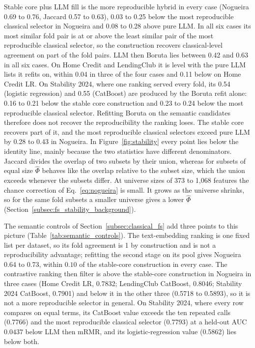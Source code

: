 \documentclass[final,5p,twocolumn]{elsarticle}
\begin{document}
Stable core plus LLM fill is the more reproducible hybrid in every case (Nogueira 0.69 to 0.76, Jaccard 0.57 to 0.63), 0.03 to 0.25 below the most reproducible classical selector in Nogueira and 0.08 to 0.28 above pure LLM. In all six cases its most similar fold pair is at or above the least similar pair of the most reproducible classical selector, so the construction recovers classical-level agreement on part of the fold pairs. LLM then Boruta lies between 0.42 and 0.63 in all six cases. On Home Credit and LendingClub it is level with the pure LLM lists it refits on, within 0.04 in three of the four cases and 0.11 below on Home Credit LR. On Stability 2024, where one ranking served every fold, its 0.54 (logistic regression) and 0.55 (CatBoost) are produced by the Boruta refit alone: 0.16 to 0.21 below the stable core construction and 0.23 to 0.24 below the most reproducible classical selector. Refitting Boruta on the semantic candidates therefore does not recover the reproducibility the ranking loses. The stable core recovers part of it, and the most reproducible classical selectors exceed pure LLM by 0.28 to 0.43 in Nogueira. In Figure~\ref{fig:stability} every point lies below the identity line, mainly because the two statistics have different denominators. Jaccard divides the overlap of two subsets by their union, whereas for subsets of equal size $\hat\Phi$ behaves like the overlap relative to the subset size, which the union exceeds whenever the subsets differ. At universe sizes of 373 to 1,068 features the chance correction of Eq.~\eqref{eq:nogueira} is small. It grows as the universe shrinks, so for the same fold subsets a smaller universe gives a lower $\hat\Phi$ (Section~\ref{subsec:fs_stability_background}).

The semantic controls of Section~\ref{subsec:classical_fs} add three points to this picture (Table~\ref{tab:semantic_controls}). The text-embedding ranking is one fixed list per dataset, so its fold agreement is 1 by construction and is not a reproducibility advantage; refitting the second stage on its pool gives Nogueira 0.64 to 0.73, within $0.10$ of the stable-core construction in every case. The contrastive ranking then filter is above the stable-core construction in Nogueira in three cases (Home Credit LR, 0.7832; LendingClub CatBoost, 0.8046; Stability 2024 CatBoost, 0.7901) and below it in the other three (0.5718 to 0.5893), so it is not a more reproducible selector in general. On Stability 2024, where every row compares on equal terms, its CatBoost value exceeds the ten repeated calls (0.7766) and the most reproducible classical selector (0.7793) at a held-out AUC $0.0437$ below LLM then mRMR, and its logistic-regression value (0.5862) lies below both.
\end{document}
